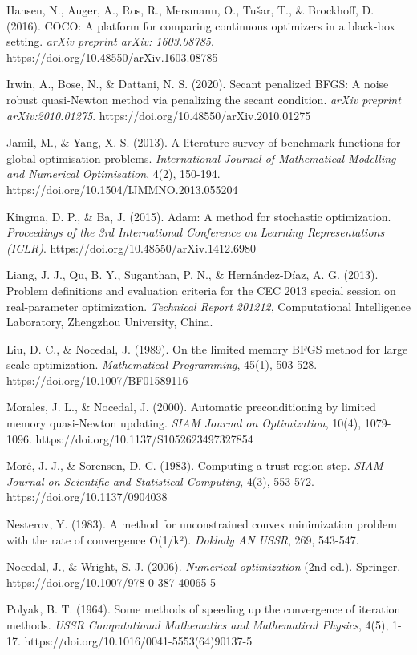 Hansen, N., Auger, A., Ros, R., Mersmann, O., Tušar, T., \& Brockhoff, D. (2016). COCO: A platform for comparing
continuous optimizers in a black-box setting. \emph{arXiv preprint arXiv:
1603.08785}. https://doi.org/10.48550/arXiv.1603.08785

Irwin, A., Bose, N., \& Dattani, N. S. (2020). Secant penalized BFGS: A noise robust quasi-Newton method via penalizing
the secant condition. \emph{arXiv preprint arXiv:2010.01275}. https://doi.org/10.48550/arXiv.2010.01275

Jamil, M., \& Yang, X. S. (2013). A literature survey of benchmark functions for global optimisation problems.
\emph{International Journal of Mathematical Modelling and Numerical Optimisation}, 4(2),
150-194. https://doi.org/10.1504/IJMMNO.2013.055204

Kingma, D. P., \& Ba, J. (2015). Adam: A method for stochastic optimization. \emph{Proceedings of the 3rd International
Conference on Learning Representations (ICLR)}. https://doi.org/10.48550/arXiv.1412.6980

Liang, J. J., Qu, B. Y., Suganthan, P. N., \& Hernández-Díaz, A. G. (2013). Problem definitions and evaluation criteria
for the CEC 2013 special session on real-parameter optimization. \emph{Technical Report 201212}, Computational Intelligence
Laboratory, Zhengzhou University, China.

Liu, D. C., \& Nocedal, J. (1989). On the limited memory BFGS method for large scale optimization. \emph{Mathematical
Programming}, 45(1), 503-528. https://doi.org/10.1007/BF01589116

Morales, J. L., \& Nocedal, J. (2000). Automatic preconditioning by limited memory quasi-Newton updating. \emph{SIAM Journal
on Optimization}, 10(4), 1079-1096. https://doi.org/10.1137/S1052623497327854

Moré, J. J., \& Sorensen, D. C. (1983). Computing a trust region step. \emph{SIAM Journal on Scientific and Statistical
Computing}, 4(3), 553-572. https://doi.org/10.1137/0904038

Nesterov, Y. (1983). A method for unconstrained convex minimization problem with the rate of convergence O(1/k²).
\emph{Doklady AN USSR}, 269, 543-547.

Nocedal, J., \& Wright, S. J. (2006). \emph{Numerical optimization} (2nd ed.).
Springer. https://doi.org/10.1007/978-0-387-40065-5

Polyak, B. T. (1964). Some methods of speeding up the convergence of iteration methods. \emph{USSR Computational Mathematics
and Mathematical Physics}, 4(5), 1-17. https://doi.org/10.1016/0041-5553(64)90137-5

